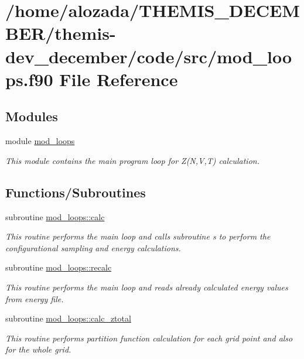 \hypertarget{mod__loops_8f90}{}\section{/home/alozada/\+T\+H\+E\+M\+I\+S\+\_\+\+D\+E\+C\+E\+M\+B\+E\+R/themis-\/dev\+\_\+december/code/src/mod\+\_\+loops.f90 File Reference}
\label{mod__loops_8f90}
\subsection*{Modules}
\begin{DoxyCompactItemize}
\item 
module \hyperlink{namespacemod__loops}{mod\+\_\+loops}
\begin{DoxyCompactList}\small\item\em This module contains the main program loop for Z(\+N,\+V,\+T) calculation. \end{DoxyCompactList}\end{DoxyCompactItemize}
\subsection*{Functions/\+Subroutines}
\begin{DoxyCompactItemize}
\item 
subroutine \hyperlink{namespacemod__loops_a6e4de9cf9c585c364502a63d328071bd}{mod\+\_\+loops\+::calc}
\begin{DoxyCompactList}\small\item\em This routine performs the main loop and calls subroutine s to perform the configurational sampling and energy calculations. \end{DoxyCompactList}\item 
subroutine \hyperlink{namespacemod__loops_a755c1c6e9232a99181d4ac9a7c0c5cff}{mod\+\_\+loops\+::recalc}
\begin{DoxyCompactList}\small\item\em This routine performs the main loop and reads already calculated energy values from energy file. \end{DoxyCompactList}\item 
subroutine \hyperlink{namespacemod__loops_acfec0f16ef59b6277e9dfd13d5026965}{mod\+\_\+loops\+::calc\+\_\+ztotal}
\begin{DoxyCompactList}\small\item\em This routine performs partition function calculation for each grid point and also for the whole grid. \end{DoxyCompactList}\end{DoxyCompactItemize}
